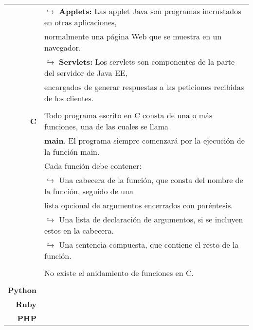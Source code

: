 \documentclass[a4paper,10pt]{article}
\begin{document}
\begin{tabular}{r|l}
            & $\hookrightarrow{}$ \textbf{Applets:} Las applet Java son programas incrustados en otras aplicaciones, \\ 
            & normalmente una página Web que se muestra en un navegador. \\
            & $\hookrightarrow{}$ \textbf{Servlets:} Los servlets son componentes de la parte del servidor de Java EE, \\
            & encargados de generar respuestas a las peticiones recibidas de los clientes. \\
            & \\
        \textbf{C}
            & Todo programa escrito en C consta de una o más funciones, una de las cuales se llama \\
            & \textbf{main}. El programa siempre comenzará por la ejecución de la función main. \\ 
            & Cada función debe contener: \\
            & $\hookrightarrow{}$ Una cabecera de la función, que consta del nombre de la función, seguido de una \\
            & lista opcional de argumentos encerrados con paréntesis. \\
            & $\hookrightarrow{}$ Una lista de declaración de argumentos, si se incluyen estos en la cabecera. \\
            & $\hookrightarrow{}$ Una sentencia compuesta, que contiene el resto de la función. \\
            & \\
            & No existe el anidamiento de funciones en C. \\
            & \\
        \textbf{Python} 
            & \\
        \textbf{Ruby}
            & \\
        \textbf{PHP}
            & \\
        
    \end{tabular}
\end{document}
